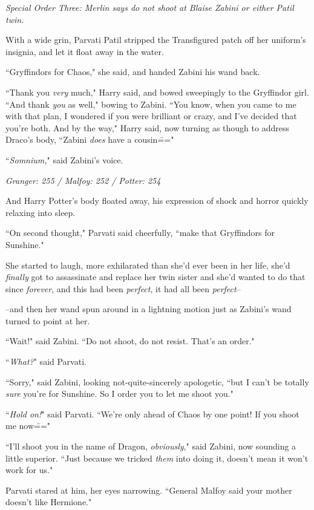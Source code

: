 \emph{Special Order Three: Merlin says do not shoot at Blaise Zabini or either Patil twin.}

With a wide grin, Parvati Patil stripped the Transfigured patch off her uniform's insignia, and let it float away in the water.

``Gryffindors for Chaos," she said, and handed Zabini his wand back.

``Thank you \emph{very} much," Harry said, and bowed sweepingly to the Gryffindor girl. ``And thank \emph{you} as well," bowing to Zabini. ``You know, when you came to me with that plan, I wondered if you were brilliant or crazy, and I've decided that you're both. And by the way," Harry said, now turning as though to address Draco's body, ``Zabini \emph{does} have a cousin\==="

``\emph{Somnium,}" said Zabini's voice.

\later

\emph{Granger: 255 / Malfoy: 252 / Potter: 254}

And Harry Potter's body floated away, his expression of shock and horror quickly relaxing into sleep.

``On second thought," Parvati said cheerfully, ``make that Gryffindors for Sunshine."

She started to laugh, more exhilarated than she'd ever been in her life, she'd \emph{finally} got to assassinate and replace her twin sister and she'd wanted to do that since \emph{forever}, and this had been \emph{perfect}, it had all been \emph{perfect}\---

\---and then her wand spun around in a lightning motion just as Zabini's wand turned to point at her.

``Wait!" said Zabini. ``Do not shoot, do not resist. That's an order."

``\emph{What?}" said Parvati.

``Sorry," said Zabini, looking not-quite-sincerely apologetic, ``but I can't be totally \emph{sure} you're for Sunshine. So I order you to let me shoot you."

``\emph{Hold on!}" said Parvati. ``We're only ahead of Chaos by one point! If you shoot me now\==="

``I'll shoot you in the name of Dragon, \emph{obviously}," said Zabini, now sounding a little superior. ``Just because we tricked \emph{them} into doing it, doesn't mean it won't work for us."

Parvati stared at him, her eyes narrowing. ``General Malfoy said your mother doesn't like Hermione."

